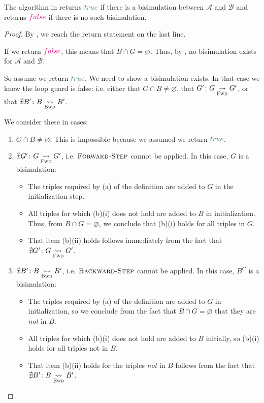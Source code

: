\documentclass[acmsmall,dvipsnames,nonacm]{acmart}
\newcommand\false{\textcolor{magenta}{false}}
\newcommand\true{\textcolor{codegreen}{true}}
\newcommand\Fwd{\textsc{Forward-Step}}
\newcommand\Bkwd{\textsc{Backward-Step}}
\newcommand\A{\mathcal{A}}
\newcommand\B{\mathcal{B}}
\newcommand\farr{\underset{\textsc{Fwd}}{\leadsto}}
\newcommand\barr{\underset{\textsc{Bwd}}{\leadsto}}
\begin{document}
\begin{theorem}\label{thm:unified-correct}
The algorithm in  returns $\true$ if there is a
bisimulation between $\mathcal{A}$ and $\mathcal{B}$ and returns $\false$ if
there is no such bisimulation.
\end{theorem}
\begin{proof}
  By , we reach the return statement on the last line.

  If we return $\false$, this means that $B \cap G = \varnothing$. Thus, by , no bisimulation
  exists for $\A$ and $\B$.

  So assume we return $\true$. We need to show a bisimulation exists.
  In that case we know the loop guard is false: i.e. either that $G\cap B \neq \varnothing$,
  that $G'\colon G\farr G'$, or that $\nexists B'\colon B \barr B'$.

  We consider these in cases:
  \begin{enumerate}
    \item $G\cap B \neq \varnothing$. This is impossible because we assumed we
      return $\true$.
    \item $\nexists G'\colon G \farr G'$, i.e. $\Fwd$ cannot be applied. In
    this case, $G$ is a bisimulation:
        \begin{itemize}
          \item The triples required by (a) of the definition are added to $G$
            in the initialization step.
          \item All triples for which (b)(i) does not hold are added to $B$
            in initialization. Thus, from $B \cap G = \varnothing$, we conclude that
            (b)(i) holds for all triples in  $G$.
          \item That item (b)(ii) holds follows immediately from the fact
          that $\nexists G'\colon G \farr G'$.
        \end{itemize}
    \item $\nexists B'\colon B \barr B'$, i.e. $\Bkwd$ cannot be applied. In
    this case, $B^C$ is a bisimulation:
        \begin{itemize}
          \item The triples required by (a) of the definition are added to $G$
          in initialization, so we conclude from the fact that $B \cap G = \varnothing$
          that they are \emph{not} in $B$.
          \item All triples for which (b)(i) does not hold are added to $B$
          initially, so (b)(i) holds for all triples not in $B$.
          \item That item (b)(ii) holds for the triples \emph{not} in $B$ follows
          from the fact that $\nexists B'\colon B \barr B'$.
        \end{itemize}
      \end{enumerate}
\end{proof}
\end{document}
